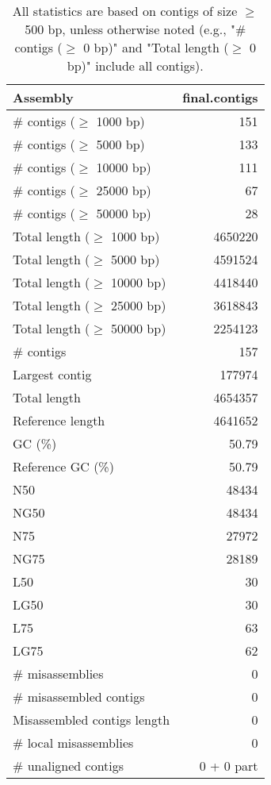 \documentclass[12pt,a4paper]{article}
\begin{document}
\begin{table}[ht]
\begin{center}
\caption{All statistics are based on contigs of size $\geq$ 500 bp, unless otherwise noted (e.g., "\# contigs ($\geq$ 0 bp)" and "Total length ($\geq$ 0 bp)" include all contigs).}
\begin{tabular}{|l*{1}{|r}|}
\hline
Assembly & final.contigs \\ \hline
\# contigs ($\geq$ 1000 bp) & 151 \\ \hline
\# contigs ($\geq$ 5000 bp) & 133 \\ \hline
\# contigs ($\geq$ 10000 bp) & 111 \\ \hline
\# contigs ($\geq$ 25000 bp) & 67 \\ \hline
\# contigs ($\geq$ 50000 bp) & 28 \\ \hline
Total length ($\geq$ 1000 bp) & 4650220 \\ \hline
Total length ($\geq$ 5000 bp) & 4591524 \\ \hline
Total length ($\geq$ 10000 bp) & 4418440 \\ \hline
Total length ($\geq$ 25000 bp) & 3618843 \\ \hline
Total length ($\geq$ 50000 bp) & 2254123 \\ \hline
\# contigs & 157 \\ \hline
Largest contig & 177974 \\ \hline
Total length & 4654357 \\ \hline
Reference length & 4641652 \\ \hline
GC (\%) & 50.79 \\ \hline
Reference GC (\%) & 50.79 \\ \hline
N50 & 48434 \\ \hline
NG50 & 48434 \\ \hline
N75 & 27972 \\ \hline
NG75 & 28189 \\ \hline
L50 & 30 \\ \hline
LG50 & 30 \\ \hline
L75 & 63 \\ \hline
LG75 & 62 \\ \hline
\# misassemblies & 0 \\ \hline
\# misassembled contigs & 0 \\ \hline
Misassembled contigs length & 0 \\ \hline
\# local misassemblies & 0 \\ \hline
\# unaligned contigs & 0 + 0 part \\ \hline

\end{tabular}
\end{center}
\end{table}
\end{document}
